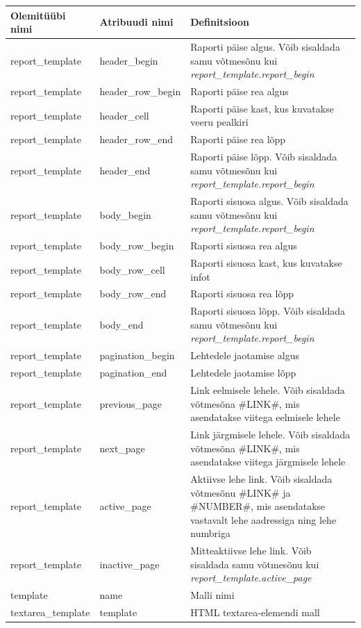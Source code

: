 \documentclass[a4paper,12pt]{article} %
\begin{document}
\begin{table}[H]
\centering
\begin{tabular}{|p{5cm}|p{5cm}|p{5cm}|}
\hline
\rowcolor{rowgray}
Olemitüübi nimi & Atribuudi nimi & Definitsioon \\ \hline
report\_template & header\_begin & Raporti päise algus. Võib sisaldada samu võtmesõnu kui \textit{report\_template.report\_begin} \\ \hline
report\_template & header\_row\_begin & Raporti päise rea algus \\ \hline
report\_template & header\_cell & Raporti päise kast, kus kuvatakse veeru pealkiri \\ \hline
report\_template & header\_row\_end & Raporti päise rea lõpp \\ \hline
report\_template & header\_end & Raporti päise lõpp. Võib sisaldada samu võtmesõnu kui \textit{report\_template.report\_begin} \\ \hline
report\_template & body\_begin & Raporti sisuosa algus. Võib sisaldada samu võtmesõnu kui \textit{report\_template.report\_begin} \\ \hline
report\_template & body\_row\_begin & Raporti sisuosa rea algus \\ \hline
report\_template & body\_row\_cell & Raporti sisuosa kast, kus kuvatakse infot \\ \hline
report\_template & body\_row\_end & Raporti sisuosa rea lõpp \\ \hline
report\_template & body\_end & Raporti sisuosa lõpp. Võib sisaldada samu võtmesõnu kui \textit{report\_template.report\_begin} \\ \hline
report\_template & pagination\_begin & Lehtedele jaotamise algus \\ \hline
report\_template & pagination\_end & Lehtedele jaotamise lõpp \\ \hline
report\_template & previous\_page & Link eelmisele lehele. Võib sisaldada võtmesõna \#LINK\#, mis asendatakse viitega eelmisele lehele \\ \hline
report\_template & next\_page & Link järgmisele lehele. Võib sisaldada võtmesõna \#LINK\#, mis asendatakse viitega järgmisele lehele \\ \hline
report\_template & active\_page & Aktiivse lehe link. Võib sisaldada võtmesõnu \#LINK\# ja \#NUMBER\#, mis asendatakse vastavalt lehe aadressiga ning lehe numbriga \\ \hline
report\_template & inactive\_page & Mitteaktiivse lehe link. Võib sisaldada samu võtmesõnu kui \textit{report\_template.active\_page} \\ \hline
template & name & Malli nimi \\ \hline
textarea\_template & template & HTML textarea-elemendi mall \\ \hline
\end{tabular}
\end{table}
\end{document}
